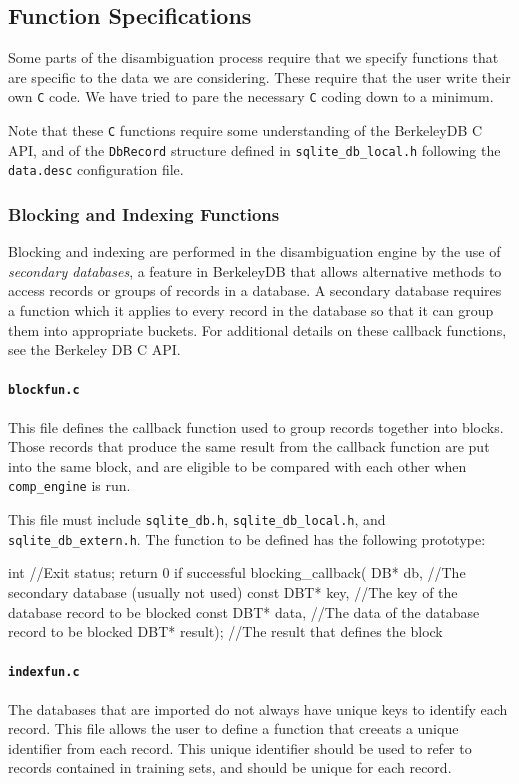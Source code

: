 \documentclass[10pt, letterpaper]{article}
\begin{document}
\subsection{Function Specifications}
Some parts of the disambiguation process require that we specify functions that are specific to the data
we are considering. These require that the user write their own \texttt{C} code. We have tried to pare the necessary
\texttt{C} coding down to a minimum.

Note that these \texttt{C} functions require some understanding of the BerkeleyDB C API, and of the \texttt{DbRecord} structure defined in \texttt{sqlite\_db\_local.h} following the \texttt{data.desc} configuration file.
\subsubsection{Blocking and Indexing Functions}
Blocking and indexing are performed in the disambiguation engine by the use of \emph{secondary databases}, a feature in BerkeleyDB that allows alternative methods to access records or groups of records in a database. A secondary database requires a function which it applies to every record in the database so that it can group them into appropriate buckets. For additional details on these callback functions, see the Berkeley DB C API.
\paragraph{\texttt{blockfun.c}}
This file defines the callback function used to group records together into blocks.
Those records that produce the same result from the callback function are put into the
same block, and are eligible to be compared with each other when \texttt{comp\_engine} is run.

This file must include \texttt{sqlite\_db.h}, \texttt{sqlite\_db\_local.h}, and \texttt{sqlite\_db\_extern.h}.
The function to be defined has the following prototype:
\begin{verbatimtab}
int                                 //Exit status; return 0 if successful
blocking_callback( DB* db,          //The secondary database (usually not used)
                   const DBT* key,  //The key of the database record to be blocked
                   const DBT* data, //The data of the database record to be blocked
                   DBT* result);    //The result that defines the block 
\end{verbatimtab}
\paragraph{\texttt{indexfun.c}}
The databases that are imported do not always have unique keys to identify each record.
This file allows the user to define a function that creeats a unique identifier from
each record.
This unique identifier should be used to refer to records contained in training sets, 
and should be unique for each record.
\end{document}
